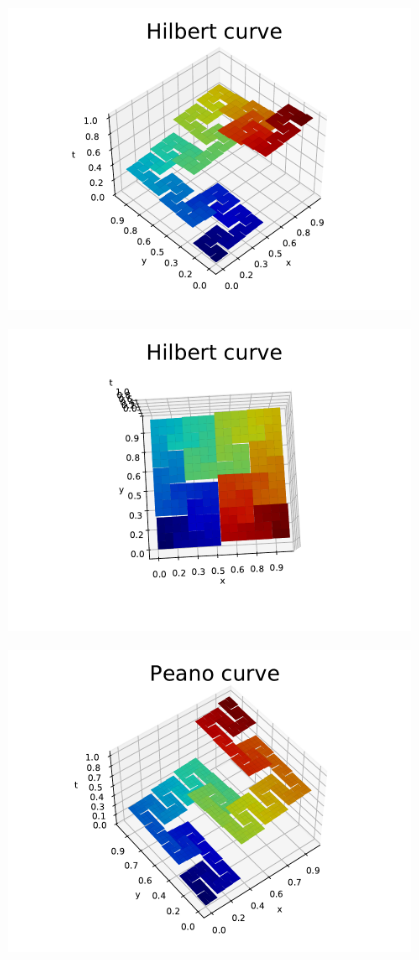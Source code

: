 \documentclass[landscape,usenames,dvipsnames, 25pt]{sciposter}
\begin{document}
\begin{multicols}{3}
\begin{center}
\begin{minipage}{0.24\columnwidth}
\centering
   \includegraphics[height=8cm]{FA20/images/fractals/hilbert-l4-1.pdf}
\end{minipage}
\begin{minipage}{0.24\columnwidth}
\centering
   \includegraphics[height=8cm]{FA20/images/fractals/hilbert-l4-2.pdf}
\end{minipage}
\begin{minipage}{0.24\columnwidth}
\centering
   \includegraphics[height=8cm]{FA20/images/fractals/peano-l3-1.pdf}

\end{minipage}
\end{center}
\end{multicols}
\end{document}
